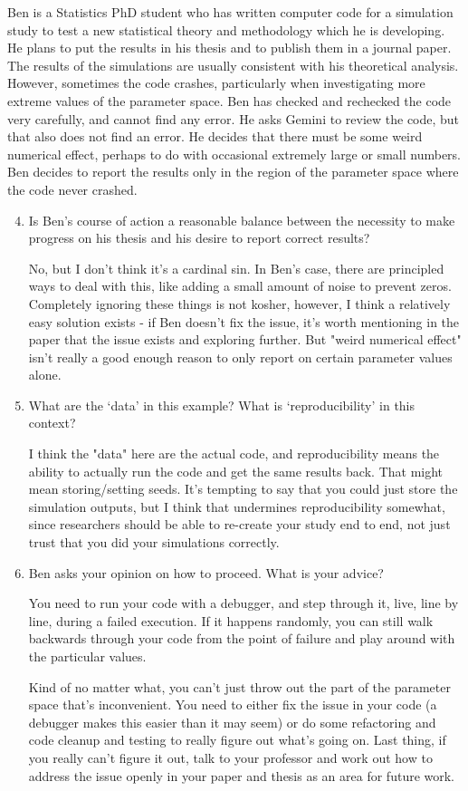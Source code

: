 \documentclass[12pt]{article}
\begin{document}
Ben is a Statistics PhD student who has written computer code for a simulation study to test a new statistical theory and methodology which he is developing.
He plans to put the results in his thesis and to publish them in a journal paper.
The results of the simulations are usually consistent with his theoretical analysis. 
However, sometimes the code crashes, particularly when investigating more extreme values of the parameter space.
Ben has checked and rechecked the code very carefully, and cannot find any error.
He asks Gemini to review the code, but that also does not find an error.
He decides that there must be some weird numerical effect, perhaps to do with occasional extremely large or small numbers.
Ben decides to report the results only in the region of the parameter space where the code never crashed. 

\begin{enumerate}\setcounter{enumi}{3}
\item Is Ben's course of action a reasonable balance between the necessity to make progress on his thesis and his desire to report correct results? 

No, but I don't think it's a cardinal sin. In Ben's case, there are principled ways to deal with this, like adding a small amount of noise to prevent zeros. 
Completely ignoring these things is not kosher, however, I think a relatively easy solution exists - if 
Ben doesn't fix the issue, it's worth mentioning in the paper that the issue exists and exploring further. But "weird numerical effect" isn't
really a good enough reason to only report on certain parameter values alone.

\item What are the `data' in this example? What is `reproducibility' in this context?

I think the "data" here are the actual code, and reproducibility means the ability to actually run the code and get the same results back. That 
might mean storing/setting seeds. It's tempting to say that you could just store the simulation outputs, but I think that undermines reproducibility 
somewhat, since researchers should be able to re-create your study end to end, not just trust that you did your simulations correctly.

\item Ben asks your opinion on how to proceed. What is your advice?

You need to run your code with a debugger, and step through it, live, line by line, during a failed execution. If it happens randomly, you can still
walk backwards through your code from the point of failure and play around with the particular values.

Kind of no matter what, you can't just throw out the part of the parameter space that's inconvenient. You need to either fix the issue in your code 
(a debugger makes this easier than it may seem) or do some refactoring and code cleanup and testing to really figure out what's going on. Last thing, if you
really can't figure it out, talk to your professor and work out how to address the issue openly in your paper and thesis as an area for future work.
\end{enumerate}
\end{document}
